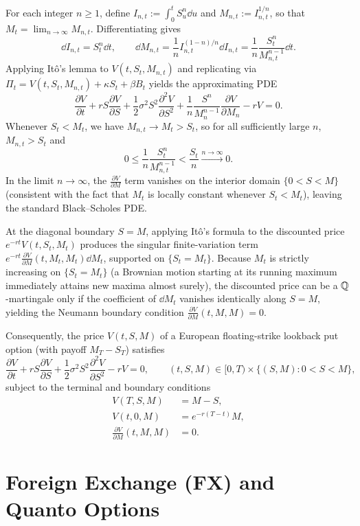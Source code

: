 For each integer $n \ge 1$, define $I_{n, t} := \int_0^t S_u^n \dd u$ and $M_{n, t} := I_{n, t}^{1/n}$, so that $M_t = \lim_{n \to \infty} M_{n, t}$. Differentiating gives
\[
\dd I_{n, t} = S_t^n \dd t, \qquad \dd M_{n, t} = \frac{1}{n} I_{n, t}^{(1-n)/n}\dd I_{n, t} = \frac{1}{n}\frac{S_t^n}{M_{n, t}^{n-1}}\dd t.
\]
Applying It\^{o}'s lemma to $V(t, S_t, M_{n, t})$ and replicating via $\Pi_t = V(t, S_t, M_{n, t}) + \kappa S_t + \beta B_t$ yields the approximating PDE
\[
\frac{\partial V}{\partial t} + r S \frac{\partial V}{\partial S} + \frac{1}{2}\sigma^2 S^2 \frac{\partial^2 V}{\partial S^2} + \frac{1}{n}\frac{S^n}{M_n^{n-1}}\frac{\partial V}{\partial M_n} - r V = 0.
\]
Whenever $S_t < M_t$, we have $M_{n, t} \to M_t > S_t$, so for all sufficiently large $n$, $M_{n, t} > S_t$ and
\[
0 \le \frac{1}{n}\frac{S_t^n}{M_{n, t}^{n-1}} < \frac{S_t}{n} \xrightarrow{n \to \infty} 0.
\]
In the limit $n \to \infty$, the $\frac{\partial V}{\partial M}$ term vanishes on the interior domain $\{0 < S < M\}$ (consistent with the fact that $M_t$ is locally constant whenever $S_t < M_t$), leaving the standard Black--Scholes PDE.

At the diagonal boundary $S = M$, applying It\^{o}'s formula to the discounted price $e^{-rt}V(t, S_t, M_t)$ produces the singular finite-variation term $e^{-rt}\frac{\partial V}{\partial M}(t, M_t, M_t)\dd M_t$, supported on $\{S_t = M_t\}$. Because $M_t$ is strictly increasing on $\{S_t = M_t\}$ (a Brownian motion starting at its running maximum immediately attains new maxima almost surely), the discounted price can be a $\mathbb{Q}$-martingale only if the coefficient of $\dd M_t$ vanishes identically along $S = M$, yielding the Neumann boundary condition $\frac{\partial V}{\partial M}(t, M, M) = 0$.

Consequently, the price $V(t, S, M)$ of a European floating-strike lookback put option (with payoff $M_T - S_T$) satisfies
\[
\frac{\partial V}{\partial t} + r S \frac{\partial V}{\partial S} + \frac{1}{2}\sigma^2 S^2 \frac{\partial^2 V}{\partial S^2} - r V = 0, \qquad (t, S, M) \in [0, T) \times \{(S, M) : 0 < S < M\},
\]
subject to the terminal and boundary conditions
\[
\begin{aligned}
    V(T, S, M) &= M - S, \\
    V(t, 0, M) &= e^{-r(T-t)} M, \\
    \frac{\partial V}{\partial M}(t, M, M) &= 0.
\end{aligned}
\]

\section{Foreign Exchange (FX) and Quanto Options}

